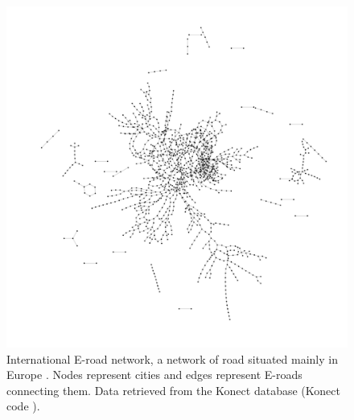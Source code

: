 \documentclass[
11pt, %
english, %
singlespacing, %
nolistspacing, %
liststotoc, %
headsepline, %
]{MastersDoctoralThesis} %
\begin{document}
\begin{figure}
	\includegraphics[width=\textwidth]{network-subelj_euroroad.pdf}
	\caption{International E-road network, a network of road situated mainly in Europe \cite{subelj2011robust}. Nodes represent cities and edges represent E-roads connecting them. Data retrieved from the Konect database \cite{kunegis2013konect} (Konect code ).}
	\label{Figure: Network euroroad}
\end{figure}
\end{document}
